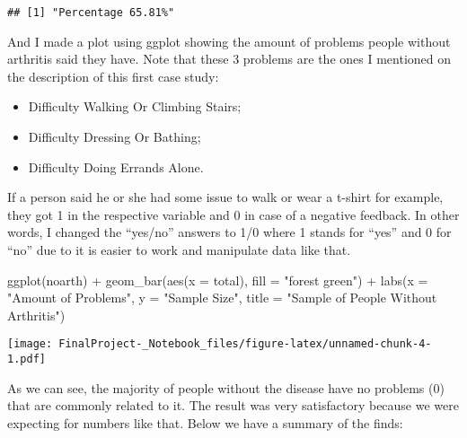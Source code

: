 \documentclass[
]{article}
\newenvironment{Shaded}{\begin{snugshade}}{\end{snugshade}}
\newcommand{\AttributeTok}[1]{\textcolor[rgb]{0.77,0.63,0.00}{#1}}
\newcommand{\FunctionTok}[1]{\textcolor[rgb]{0.00,0.00,0.00}{#1}}
\newcommand{\NormalTok}[1]{#1}
\newcommand{\SpecialCharTok}[1]{\textcolor[rgb]{0.00,0.00,0.00}{#1}}
\newcommand{\StringTok}[1]{\textcolor[rgb]{0.31,0.60,0.02}{#1}}
\providecommand{\tightlist}{%
  \setlength{\itemsep}{0pt}\setlength{\parskip}{0pt}}
\begin{document}
\begin{verbatim}
## [1] "Percentage 65.81%"
\end{verbatim}

And I made a plot using ggplot showing the amount of problems people
without arthritis said they have. Note that these 3 problems are the
ones I mentioned on the description of this first case study:

\begin{itemize}
\tightlist
\item
  Difficulty Walking Or Climbing Stairs;
\item
  Difficulty Dressing Or Bathing;
\item
  Difficulty Doing Errands Alone.
\end{itemize}

If a person said he or she had some issue to walk or wear a t-shirt for
example, they got 1 in the respective variable and 0 in case of a
negative feedback. In other words, I changed the ``yes/no'' answers to
1/0 where 1 stands for ``yes'' and 0 for ``no'' due to it is easier to
work and manipulate data like that.

\begin{Shaded}
\begin{Highlighting}[]
\FunctionTok{ggplot}\NormalTok{(noarth) }\SpecialCharTok{+}
  \FunctionTok{geom\_bar}\NormalTok{(}\FunctionTok{aes}\NormalTok{(}\AttributeTok{x =}\NormalTok{ total), }\AttributeTok{fill =} \StringTok{"forest green"}\NormalTok{) }\SpecialCharTok{+}
  \FunctionTok{labs}\NormalTok{(}\AttributeTok{x =} \StringTok{"Amount of Problems"}\NormalTok{,}
       \AttributeTok{y =} \StringTok{"Sample Size"}\NormalTok{,}
       \AttributeTok{title =} \StringTok{"Sample of People Without Arthritis"}\NormalTok{)}
\end{Highlighting}
\end{Shaded}

\texttt{[image: FinalProject-\_Notebook\_files/figure-latex/unnamed-chunk-4-1.pdf]}

As we can see, the majority of people without the disease have no
problems (0) that are commonly related to it. The result was very
satisfactory because we were expecting for numbers like that. Below we
have a summary of the finds:
\end{document}
